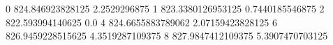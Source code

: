 0 824.846923828125 2.2529296875
1 823.3380126953125 0.7440185546875
2 822.593994140625 0.0
4 824.6655883789062 2.07159423828125
6 826.9459228515625 4.3519287109375
8 827.9847412109375 5.3907470703125
